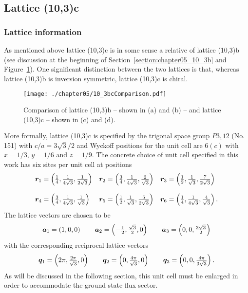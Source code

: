 \subsection{Lattice (10,3)c}
\label{section:chapter05_10_3c}
%
%
\subsubsection{Lattice information}
%
%
As mentioned above lattice (10,3)c is in some sense a relative of lattice (10,3)b (see discussion at the beginning of Section~\ref{section:chapter05_10_3b} and Figure~\ref{fig:chapter05_10_3bcComparison}).
One significant distinction between the two lattices is that, whereas lattice (10,3)b is inversion symmetric, lattice (10,3)c is chiral.
%
\begin{figure}[tb]
	\centering
	\texttt{[image: ./chapter05/10\_3bcComparison.pdf]}
	\caption{
		Comparison of lattice (10,3)b -- shown in (a) and (b) -- and lattice (10,3)c -- shown in (c) and (d).
	}
	\label{fig:chapter05_10_3bcComparison}
\end{figure}
%

More formally, lattice (10,3)c is specified by the trigonal space group $P3_{1}12$ (No. 151) with $c/a = 3\sqrt{3}/2$ and Wyckoff positions for the unit cell are $6(c)$ with $x = 1/3$, $y = 1/6$ and $z = 1/9$.
The concrete choice of unit cell specified in this work has six sites per unit cell at positions
%
\begin{equation}
	\begin{matrix*}[l]
		\br_1 = \left(\frac{1}{4}, \frac{1}{4\sqrt{3}}, \frac{1}{2\sqrt{3}}\right) &
		\br_2 = \left(\frac{3}{4}, \frac{1}{4\sqrt{3}}, \frac{2}{\sqrt{3}}\right) &
		\br_3 = \left(\frac{1}{2}, \frac{1}{\sqrt{3}}, \frac{7}{2\sqrt{3}}\right) \\
		&\\
		\br_4 = \left(\frac{3}{4}, \frac{1}{4\sqrt{3}}, \frac{1}{\sqrt{3}}\right) &
		\br_5 = \left(\frac{1}{2}, \frac{1}{\sqrt{3}}, \frac{5}{2\sqrt{3}}\right) &
		\br_6 = \left(\frac{1}{4}, \frac{1}{4\sqrt{3}}, \frac{4}{\sqrt{3}}\right).
	\end{matrix*}
\end{equation}
%
The lattice vectors are chosen to be
%
\begin{equation}
	\begin{matrix*}[l]
		\ba_1 = \left(1, 0, 0\right) \qquad
		\ba_2 = \left(-\frac{1}{2}, \frac{\sqrt{3}}{2}, 0\right) \qquad
		\ba_3 = \left(0, 0, \frac{3\sqrt{3}}{2}\right)
	\end{matrix*}
\end{equation}
%
with the corresponding reciprocal lattice vectors
%
\begin{equation}
	\begin{matrix*}[l]
		\bq_1 = \left(2\pi, \frac{2\pi}{\sqrt{3}}, 0\right) \qquad
		\bq_2 = \left(0, \frac{4\pi}{\sqrt{3}}, 0\right) \qquad
		\bq_3 = \left(0, 0, \frac{4\pi}{3\sqrt{3}}\right).
	\end{matrix*}
\end{equation}
%
As will be discussed in the following section, this unit cell must be enlarged in order to accommodate the ground state flux sector.

